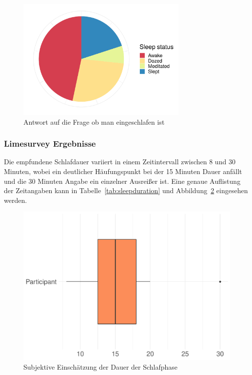 \begin{figure}[H]
	\centering
	\includegraphics[width=0.75\textwidth]{./_StudyResults/slept}
	\caption{Antwort auf die Frage ob man eingeschlafen ist}
	\label{fig:slept}
\end{figure}

\subsubsection{Limesurvey Ergebnisse}
Die empfundene Schlafdauer variiert in einem Zeitintervall zwischen 8 und 30 Minuten, wobei ein deutlicher Häufungspunkt bei der 15 Minuten Dauer anfällt und die 30 Minuten Angabe ein einzelner Ausreißer ist. Eine genaue Auflistung der Zeitangaben kann in Tabelle~\ref{tab:sleepduration} und Abbildung~\ref{fig:subjectiveSleepDuration} eingesehen werden.

\begin{figure}[H]
	\centering
	\includegraphics[width=\textwidth]{./_StudyResults/subjectiveSleepDuration}
	\caption{Subjektive Einschätzung der Dauer der Schlafphase}
	\label{fig:subjectiveSleepDuration}
\end{figure}

